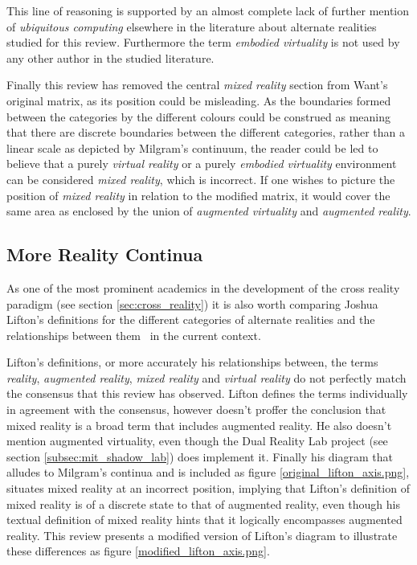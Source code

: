 This line of reasoning is supported by an almost complete lack of further mention of \textit{ubiquitous computing} elsewhere in the literature about alternate realities studied for this review. Furthermore the term \textit{embodied virtuality} is not used by any other author in the studied literature.

Finally this review has removed the central \textit{mixed reality} section from Want's original matrix, as its position could be misleading. As the boundaries formed between the categories by the different colours could be construed as meaning that there are discrete boundaries between the different categories, rather than a linear scale as depicted by Milgram's continuum, the reader could be led to believe that a purely \textit{virtual reality} or a purely \textit{embodied virtuality} environment can be considered \textit{mixed reality}, which is incorrect. If one wishes to picture the position of \textit{mixed reality} in relation to the modified matrix, it would cover the same area as enclosed by the union of \textit{augmented virtuality} and \textit{augmented reality}.

\subsection{More Reality Continua}
As one of the most prominent academics in the development of the cross reality paradigm (see section \ref{sec:cross_reality}) it is also worth comparing Joshua Lifton's definitions for the different categories of alternate realities and the relationships between them~\cite{Lifton2007a} in the current context.

Lifton's definitions, or more accurately his relationships between, the terms \textit{reality}, \textit{augmented reality}, \textit{mixed reality} and \textit{virtual reality} do not perfectly match the consensus that this review has observed. Lifton defines the terms individually in agreement with the consensus, however doesn't proffer the conclusion that mixed reality is a broad term that includes augmented reality. He also doesn't mention augmented virtuality, even though the Dual Reality Lab project (see section \ref{subsec:mit_shadow_lab}) does implement it. Finally his diagram that alludes to Milgram's continua and is included as figure \ref{original_lifton_axis.png}, situates mixed reality at an incorrect position, implying that Lifton's definition of mixed reality is of a discrete state to that of augmented reality, even though his textual definition of mixed reality hints that it logically encompasses augmented reality. This review presents a modified version of Lifton's diagram to illustrate these differences as figure \ref{modified_lifton_axis.png}.

